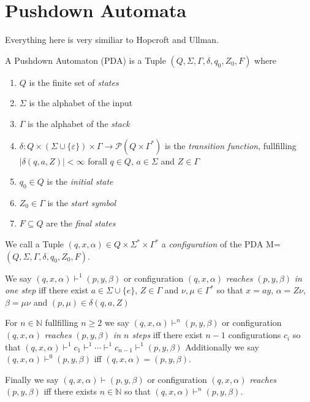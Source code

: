 \chapter{Pushdown Automata}
\setlength{\parindent}{0pt}
\setlength{\parskip}{10pt}
Everything here is very similiar to Hopcroft and Ullman.
\begin{definition}
  \label{def:PDA}
  A Pushdown Automaton (PDA) is a Tuple $(Q,\Sigma,\Gamma,\delta,q_0,Z_0,F)$ where
  \begin{enumerate}
    \item $Q$ is the finite set of \emph{states}
    \item $\Sigma$ is the alphabet of the input
    \item $\Gamma$ is the alphabet of the \emph{stack}
    \item $\delta : Q\times(\Sigma\cup\{\varepsilon\})\times\Gamma\to\mathcal{P}(Q\times\Gamma^*)$
      is the \emph{transition function}, fullfilling $|\delta(q,a,Z)|<\infty$ forall $q\in Q$,
      $a\in\Sigma$ and $Z \in \Gamma$
    \item $q_0\in Q$ is the \emph{initial state}
    \item $Z_0 \in \Gamma$ is the \emph{start symbol}
    \item $F\subseteq Q$ are the \emph{final states}
  \end{enumerate}
\end{definition}

\begin{definition}
  \label{def:PDA_conf}
  We call a Tuple $(q,x,\alpha)\in Q\times\Sigma^*\times\Gamma^*$ a \emph{configuration} of the PDA
  M=$(Q,\Sigma,\Gamma,\delta,q_0,Z_0,F)$.


\end{definition}
\begin{definition}
  \label{def:PDA_reaches}
  We say $(q,x,\alpha)\vdash^1(p,y,\beta)$ or configuration $(q,x,\alpha)$ \emph{reaches} $(p,y,\beta)$
  \emph{in one step} iff there exist $a\in\Sigma\cup\{e\}$, $Z\in\Gamma$
  and $\nu,\mu \in \Gamma^*$ so that  $x=ay$, $\alpha=Z\nu$,
  $\beta=\mu\nu$ and $(p,\mu)\in\delta(q,a,Z)$

  For $n\in\mathbb{N}$ fullfilling $n\ge 2$
  we say $(q,x,\alpha)\vdash^n(p,y,\beta)$ or configuration $(q,x,\alpha)$ \emph{reaches} $(p,y,\beta)$
  \emph{in $n$ steps} iff there exist $n-1$ configurations $c_i$ so that
  $(q,x,\alpha)\vdash^1c_1\vdash^1\cdots\vdash^1c_{n-1}\vdash^1(p,y,\beta)$
  Additionally we say $(q,x,\alpha)\vdash^0(p,y,\beta)$ iff $(q,x,\alpha)=(p,y,\beta)$.

  Finally we say $(q,x,\alpha)\vdash(p,y,\beta)$ or configuration $(q,x,\alpha)$ \emph{reaches}
  $(p,y,\beta)$ iff there exists $n\in\mathbb{N}$ so that $(q,x,\alpha)\vdash^n(p,y,\beta)$.

\end{definition}

